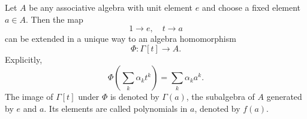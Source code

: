 Let $A$ be any associative algebra with unit element $e$ and choose a fixed element $a \in A$. Then the map
$$1 \rightarrow e, \quad t \rightarrow a$$
can be extended in a unique way to an algebra homomorphism
$$\Phi: \Gamma[t] \rightarrow A.$$
Explicitly,
$$\Phi\left(\sum_k \alpha_k t^k\right) = \sum_k \alpha_k a^k.$$
The image of $\Gamma[t]$ under $\Phi$ is denoted by $\Gamma(a)$, the subalgebra of $A$ generated by $e$ and $a$. Its elements are called polynomials in $a$, denoted by $f(a)$.
